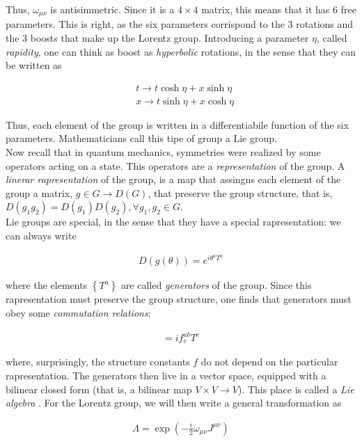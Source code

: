 \documentclass{report}
\begin{document}
Thus, \(\omega_{\mu\nu}\) is antisimmetric. Since it is a \(4\times 4\) matrix, this means that it has 6 free parameters. This is right, as the six parameters corrispond to the 3 rotations and the 3 boosts that make up the Lorentz group. Introducing a parameter \(\eta\), called \emph{rapidity}, one can think as boost as \emph{hyperbolic} rotations, in the sense that they can be written as 

\begin{align}
    &t \rightarrow t\cosh \eta + x \sinh\eta \\
    &x \rightarrow t\sinh \eta + x\cosh\eta 
\end{align}

Thus, each element of the group is written in a differentiabile function of the six parameters. Mathematicians call this tipe of group a Lie group. \\

Now recall that in quantum mechanics, symmetries were realized by some operators acting on a state. This operators are a \emph{representation} of the group. A \emph{linerar rapresentation} of the group, is a map that assingns each element of the group a matrix, \(g \in G \rightarrow D(G)\), that preserve the group structure, that is, \(D(g_1 g_2) = D(g_1)D(g_2), \forall g_1, g_2 \in G\). \\

Lie groups are special, in the sense that they have a special rapresentation: we can always write 

\begin{align}
    D(g(\theta)) = e^{i\theta^a T^a} 
\end{align}

where the elements \(\left\{T^a \right\}\) are called \emph{generators} of the group. Since this rapresentation must preserve the group structure, one finds that generators must obey some \emph{commutation relations}: 

\begin{align}
    [T^a, T^b] = if^{ab}_c T^c
\end{align}

where, surprisingly, the structure constants \(f\) do not depend on the particular rapresentation. The generators then live in a vector space, equipped with a bilinear closed form (that is, a bilinear map \(V \times V \rightarrow V\)). This place is called a \emph{Lie algebra} . For the Lorentz group, we will then write a general transformation as 

\begin{align}
    \Lambda = \exp\left(-\frac{i}{2}\omega_{\mu\nu}J^{\mu\nu} \right)
\end{align}
\end{document}
